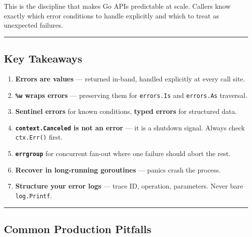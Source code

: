 \documentclass[11pt,openany]{book}
\providecommand{\tightlist}{%
  \setlength{\itemsep}{0pt}\setlength{\parskip}{0pt}}
\begin{document}
This is the discipline that makes Go APIs predictable at scale. Callers
know exactly which error conditions to handle explicitly and which to
treat as unexpected failures.

\begin{center}\rule{0.5\linewidth}{0.5pt}\end{center}

\hypertarget{key-takeaways-3}{%
\subsection{Key Takeaways}\label{key-takeaways-3}}

\begin{enumerate}
\def\labelenumi{\arabic{enumi}.}
\tightlist
\item
  \textbf{Errors are values} --- returned in-band, handled explicitly at
  every call site.
\item
  \textbf{\texttt{\%w} wraps errors} --- preserving them for
  \texttt{errors.Is} and \texttt{errors.As} traversal.
\item
  \textbf{Sentinel errors} for known conditions, \textbf{typed errors}
  for structured data.
\item
  \textbf{\texttt{context.Canceled} is not an error} --- it is a
  shutdown signal. Always check \texttt{ctx.Err()} first.
\item
  \textbf{\texttt{errgroup}} for concurrent fan-out where one failure
  should abort the rest.
\item
  \textbf{Recover in long-running goroutines} --- panics crash the
  process.
\item
  \textbf{Structure your error logs} --- trace ID, operation,
  parameters. Never bare \texttt{log.Printf}.
\end{enumerate}

\begin{center}\rule{0.5\linewidth}{0.5pt}\end{center}

\hypertarget{common-production-pitfalls-3}{%
\subsection{Common Production
Pitfalls}\label{common-production-pitfalls-3}}
\end{document}
